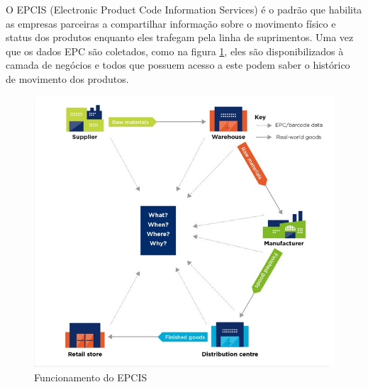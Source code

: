 \documentclass[a4paper,12pt,titlepage]{article}
\begin{document}
	O EPCIS (Electronic Product Code Information Services) é o padrão que habilita as empresas parceiras a compartilhar informação sobre o movimento físico e status dos produtos enquanto eles trafegam pela linha de suprimentos. Uma vez que os dados EPC são coletados, como na figura \ref*{fig:epcrfid}, eles são disponibilizados à camada de negócios e todos que possuem acesso a este podem saber o histórico de movimento dos produtos. 
	\begin{figure}[h!]
		\centering
		\includegraphics[width=0.7\linewidth]{epcis}
		\caption{Funcionamento do EPCIS}
		\label{fig:epcrfid}
	\end{figure}
		
\end{document}
